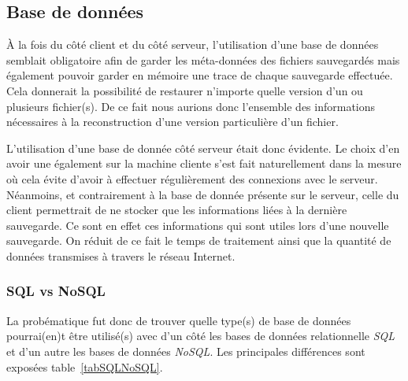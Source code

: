 \documentclass[a4paper,10pt, twoside]{report}
\begin{document}
\begin{spacing}{1.2}
\subsection{Base de données}
À la fois du côté client et du côté serveur, l'utilisation d'une
base de données semblait obligatoire afin de garder les méta-données
des fichiers sauvegardés mais également pouvoir garder en mémoire une
trace de chaque sauvegarde effectuée. Cela donnerait la possibilité
de restaurer n'importe quelle version d'un ou plusieurs fichier(s). De ce fait
nous aurions donc l'ensemble des informations nécessaires à la
reconstruction d'une version particulière d'un fichier.

L'utilisation d'une base de donnée côté serveur était donc évidente.
Le choix d'en avoir une également sur la machine cliente s'est fait
naturellement dans la mesure où cela évite d'avoir à effectuer
régulièrement des connexions avec le serveur. Néanmoins, et contrairement
à la base de donnée présente sur le serveur, celle du client permettrait
de ne stocker que les informations liées à la dernière sauvegarde. Ce
sont en effet ces informations qui sont utiles lors d'une nouvelle sauvegarde.
On réduit de ce fait le temps de traitement ainsi que la quantité de
données transmises à travers le réseau Internet.

\subsubsection{SQL vs NoSQL}
La probématique fut donc de trouver quelle type(s) de base de données
pourrai(en)t être utilisé(s) avec d'un côté les bases de données
relationnelle \textit{SQL} et d'un autre les bases de données \textit{NoSQL}.
Les principales différences sont exposées table~\ref{tabSQLNoSQL}.


\end{spacing}
\end{document}
